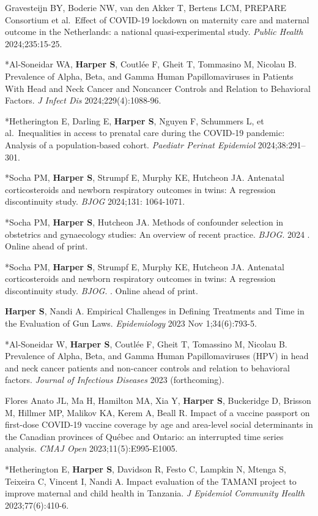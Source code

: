\documentclass[
  letterpaper,
  DIV=11,
  numbers=noendperiod]{scrartcl}
\begin{document}
Gravesteijn BY, Boderie NW, van den Akker T, Bertens LCM, PREPARE
Consortium et al.~Effect of COVID-19 lockdown on maternity care and
maternal outcome in the Netherlands: a national quasi-experimental
study. \emph{Public Health} 2024;235:15-25.

*Al-Soneidar WA, \textbf{Harper S}, Coutlée F, Gheit T, Tommasino M,
Nicolau B. Prevalence of Alpha, Beta, and Gamma Human Papillomaviruses
in Patients With Head and Neck Cancer and Noncancer Controls and
Relation to Behavioral Factors. \emph{J Infect Dis} 2024;229(4):1088-96.

*Hetherington E, Darling E, \textbf{Harper S}, Nguyen F, Schummers L, et
al.~Inequalities in access to prenatal care during the COVID‐19
pandemic: Analysis of a population‐based cohort. \emph{Paediatr Perinat
Epidemiol} 2024;38:291--301.

*Socha PM, \textbf{Harper S}, Strumpf E, Murphy KE, Hutcheon JA.
Antenatal corticosteroids and newborn respiratory outcomes in twins: A
regression discontinuity study. \emph{BJOG} 2024;131: 1064-1071.

*Socha PM, \textbf{Harper S}, Hutcheon JA. Methods of confounder
selection in obstetrics and gynaecology studies: An overview of recent
practice. \emph{BJOG}. 2024 . Online ahead of print.

*Socha PM, \textbf{Harper S}, Strumpf E, Murphy KE, Hutcheon JA.
Antenatal corticosteroids and newborn respiratory outcomes in twins: A
regression discontinuity study. \emph{BJOG}. . Online ahead of print.

\textbf{Harper S}, Nandi A. Empirical Challenges in Defining Treatments
and Time in the Evaluation of Gun Laws. \emph{Epidemiology} 2023 Nov
1;34(6):793-5.

*Al-Soneidar W, \textbf{Harper S}, Coutlée F, Gheit T, Tomassino M,
Nicolau B. Prevalence of Alpha, Beta, and Gamma Human Papillomaviruses
(HPV) in head and neck cancer patients and non-cancer controls and
relation to behavioral factors. \emph{Journal of Infectious Diseases}
2023 (forthcoming).

Flores Anato JL, Ma H, Hamilton MA, Xia Y, \textbf{Harper S}, Buckeridge
D, Brisson M, Hillmer MP, Malikov KA, Kerem A, Beall R. Impact of a
vaccine passport on first-dose COVID-19 vaccine coverage by age and
area-level social determinants in the Canadian provinces of Québec and
Ontario: an interrupted time series analysis. \emph{CMAJ Open}
2023;11(5):E995-E1005.

*Hetherington E, \textbf{Harper S}, Davidson R, Festo C, Lampkin N,
Mtenga S, Teixeira C, Vincent I, Nandi A. Impact evaluation of the
TAMANI project to improve maternal and child health in Tanzania. \emph{J
Epidemiol Community Health} 2023;77(6):410-6.
\end{document}
